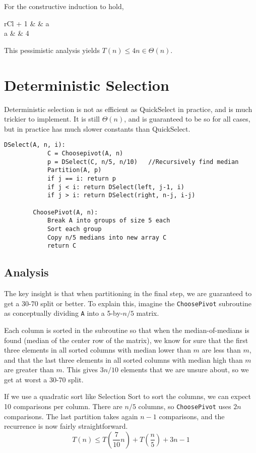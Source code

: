 \documentclass[11pt]{article}
\begin{document}
	For the constructive induction to hold,
	\begin{IEEEeqnarray}{rCl}
		 + 1 & \leq & a\\
		a & \geq & 4
	\end{IEEEeqnarray}
	This pessimistic analysis yields $T(n) \leq 4n \in \Theta(n)$.
			
\section{Deterministic Selection}
	Deterministic selection is not as efficient as QuickSelect in practice, and is much trickier to implement. It is still $\Theta(n)$, and is guaranteed to be so for all cases, but in practice has much slower constants than QuickSelect.
	\begin{lstlisting}[autogobble=true]
		DSelect(A, n, i):
			C = Choosepivot(A, n)
			p = DSelect(C, n/5, n/10)	//Recursively find median
			Partition(A, p)
			if j == i: return p
			if j < i: return DSelect(left, j-1, i)
			if j > i: return DSelect(right, n-j, i-j)
			
		ChoosePivot(A, n):
			Break A into groups of size 5 each
			Sort each group
			Copy n/5 medians into new array C
			return C
	\end{lstlisting}
	
	\subsection{Analysis}
		The key insight is that when partitioning in the final step, we are guaranteed to get a 30-70 split or better. To explain this, imagine the \verb|ChoosePivot| subroutine as conceptually dividing \verb|A| into a 5-by-$n/5$ matrix. 
		
		Each column is sorted in the subroutine so that when the median-of-medians is found (median of the center row of the matrix), we know for sure that the first three elements in all sorted columns with median lower than $m$ are less than $m$, and that the last three elements in all sorted columns with median high than $m$ are greater than $m$. This gives $3n/10$ elements that we are unsure about, so we get at worst a 30-70 split.
		
		If we use a quadratic sort like Selection Sort to sort the columns, we can expect 10 comparisons per column. There are $n/5$ columns, so \verb|ChoosePivot| uses $2n$ comparisons. The last partition takes again $n - 1$ comparisons, and the recurrence is now fairly straightforward.
		\begin{equation}
			T(n) \leq T\left( \frac{7}{10}n \right) + T\left( \frac{n}{5} \right) + 3n - 1
		\end{equation}
		
\end{document}
